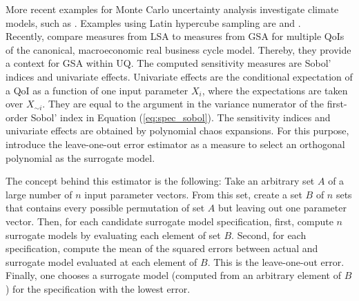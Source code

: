 \newline
More recent examples for Monte Carlo uncertainty analysis investigate climate models, such as \cite{Webster.2012}.
Examples using Latin hypercube sampling are \cite{Mattoo.2009} and \cite{Hope.2006}.\\
\newline
Recently, \cite{Harenberg.2019} compare measures from LSA to measures from GSA for multiple QoIs of the canonical, macroeconomic real business cycle model. Thereby, they provide a context for GSA within UQ. The computed sensitivity measures are Sobol' indices and univariate effects. Univariate effects are the conditional expectation of a QoI as a function of one input parameter $X_i$, where the expectations are taken over $X_{\sim i}$. They are equal to the argument in the variance numerator of the first-order Sobol' index in Equation (\ref{eq:spec_sobol}). The sensitivity indices and univariate effects are obtained by polynomial chaos expansions. For this purpose, \citeauthor{Harenberg.2019} introduce the leave-one-out error estimator as a measure to select an orthogonal polynomial as the surrogate model.

The concept behind this estimator is the following: Take an arbitrary set $A$ of a large number of $n$ input parameter vectors. From this set, create a set $B$ of $n$ sets that contains every possible permutation of set $A$ but leaving out one parameter vector. Then, for each candidate surrogate model specification, first, compute $n$ surrogate models by evaluating each element of set $B$. Second, for each specification, compute the mean of the squared errors between actual and surrogate model evaluated at each element of $B$. This is the leave-one-out error. Finally, one chooses a surrogate model (computed from an arbitrary element of $B$) for the specification with the lowest error.

